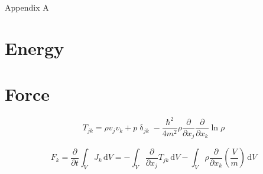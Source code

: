 \begin{chapter}{
\label{app:App2}Appendix A}
\section{\label{appsection:energy} Energy}
\section{\label{appsection:force} Force}

\begin{equation}
T_{jk} = \rho v_j v_k + p\mathrm{\updelta}_{jk} - \frac{\hbar^2}{4m^2}\rho \frac{\partial}{\partial x_j}\frac{\partial}{\partial x_k} \ln \rho
\label{eq:stressTensor}
\end{equation} 

\begin{equation}
F_k =\frac{\partial}{\partial t} \int_V J_k\,\mathrm{d}V = - \int_V \frac{\partial}{\partial x_j} T_{jk}\,\mathrm{d}V - \int_V \rho \frac{\partial}{\partial x_k} \left( \frac{V}{m} \right)\,\mathrm{d}V
\label{eq:force}
\end{equation}


\end{chapter}
